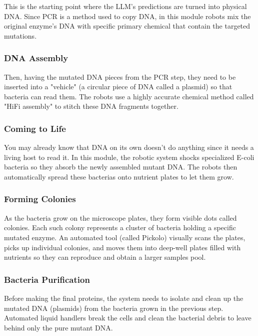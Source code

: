 \documentclass[10pt,a4paper]{article}
\begin{document}
	This is the starting point where the LLM's predictions are turned into physical DNA. Since PCR is a method used to copy DNA, in this module robots mix the original enzyme's DNA with specific primary chemical that contain the targeted mutations.
	
	\subsubsection{DNA Assembly}
	
	Then, having the mutated DNA pieces from the PCR step, they need to be inserted into a "vehicle" (a circular piece of DNA called a plasmid) so that bacteria can read them. The robots use a highly accurate chemical method called "HiFi assembly" to stitch these DNA fragments together.
	
	\subsubsection{Coming to Life}
	
	You may already know that DNA on its own doesn't do anything since it needs a living host to read it. In this module, the robotic system shocks specialized E-coli bacteria so they absorb the newly assembled mutant DNA. The robots then automatically spread these bacterias onto nutrient plates to let them grow.
	
	\subsubsection{Forming Colonies}
	
	As the bacteria grow on the microscope plates, they form visible dots called colonies. Each such colony represents a cluster of bacteria holding a specific mutated enzyme. An automated tool (called Pickolo) visually scans the plates, picks up individual colonies, and moves them into deep-well plates filled with nutrients so they can reproduce and obtain a larger samples pool.
	
	\subsubsection{Bacteria Purification}
	
	Before making the final proteins, the system needs to isolate and clean up the mutated DNA (plasmids) from the bacteria grown in the previous step. Automated liquid handlers break the cells and clean the bacterial debris to leave behind only the pure mutant DNA.
	
\end{document}
